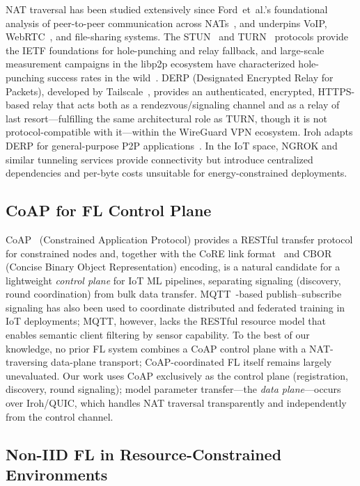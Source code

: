 ﻿\documentclass[journal]{IEEEtran}
\begin{document}
NAT traversal has been studied extensively since Ford~et~al.'s foundational analysis of peer-to-peer communication across NATs~\cite{ford2005,rfc5128}, and underpins VoIP, WebRTC~\cite{webrtc2021}, and file-sharing systems. The STUN~\cite{rfc8489} and TURN~\cite{rfc8656} protocols provide the IETF foundations for hole-punching and relay fallback, and large-scale measurement campaigns in the libp2p ecosystem have characterized hole-punching success rates in the wild~\cite{seemann2022}. DERP (Designated Encrypted Relay for Packets), developed by Tailscale~\cite{tailscale2023}, provides an authenticated, encrypted, HTTPS-based relay that acts both as a rendezvous/signaling channel and as a relay of last resort---fulfilling the same architectural role as TURN, though it is not protocol-compatible with it---within the WireGuard VPN ecosystem. Iroh adapts DERP for general-purpose P2P applications~\cite{iroh2024}. In the IoT space, NGROK and similar tunneling services provide connectivity but introduce centralized dependencies and per-byte costs unsuitable for energy-constrained deployments.

\subsection{CoAP for FL Control Plane}

CoAP~\cite{rfc7252} (Constrained Application Protocol) provides a RESTful transfer protocol for constrained nodes and, together with the CoRE link format~\cite{rfc6690} and CBOR~\cite{rfc8949} (Concise Binary Object Representation) encoding, is a natural candidate for a lightweight \emph{control plane} for IoT ML pipelines, separating signaling (discovery, round coordination) from bulk data transfer. MQTT~\cite{mqtt2019}-based publish--subscribe signaling has also been used to coordinate distributed and federated training in IoT deployments; MQTT, however, lacks the RESTful resource model that enables semantic client filtering by sensor capability. To the best of our knowledge, no prior FL system combines a CoAP control plane with a NAT-traversing data-plane transport; CoAP-coordinated FL itself remains largely unevaluated. Our work uses CoAP exclusively as the control plane (registration, discovery, round signaling); model parameter transfer---the \emph{data plane}---occurs over Iroh/QUIC, which handles NAT traversal transparently and independently from the control channel.

\subsection{Non-IID FL in Resource-Constrained Environments}
\end{document}
